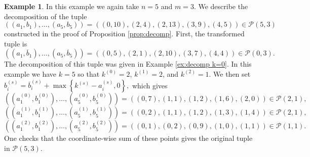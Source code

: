 \documentclass[12pt]{amsart}
\numberwithin{equation}{section}
\theoremstyle{definition}
\newtheorem{example}[theorem]{Example}
\begin{document}
\begin{example}
    In this example we again take $n=5$ and $m=3$. We describe the decomposition of the tuple
    \[ ((a_1,b_1),\dots,(a_5,b_5)) = ((0,10),(2,4),(2,13),(3,9),(4,5)) \in \mathcal{P}(5,3) \]
    constructed in the proof of Proposition \ref{prop:decomp}. First, the transformed tuple is
    \[ ((a_1,\overline{b}_1),\dots,(a_5,\overline{b}_5)) = ((0,5),(2,1),(2,10),(3,7),(4,4)) \in \mathcal{P}(0,3). \]
    The decomposition of this tuple was given in Example \ref{ex:decomp k=0}. In this example we have $k=5$ so that $k^{(0)} = 2$, $k^{(1)} = 2$, and $k^{(2)} = 1$. We then set $b^{(s)}_i = \overline{b}^{(s)}_i +\max\left\{k^{(s)} - a^{(s)}_i,0\right\},$ which gives
    \[ \left(\left(a^{(0)}_1,b^{(0)}_1\right),\dots,\left(a^{(0)}_5,b^{(0)}_5\right)\right) = ((0,7),(1,1),(1,2),(1,6),(2,0)) \in \mathcal{P}(2,1), \]
    \[ \left(\left(a^{(1)}_1,b^{(1)}_1\right),\dots,\left(a^{(1)}_5,b^{(1)}_5\right)\right) = ((0,2),(1,1),(1,2),(1,3),(1,4))\in \mathcal{P}(2,1), \]
    \[ \left(\left(a^{(2)}_1,b^{(2)}_1\right),\dots,\left(a^{(2)}_5,b^{(2)}_5\right)\right) = ((0,1),(0,2),(0,9),(1,0),(1,1))\in \mathcal{P}(1,1). \]
    One checks that the coordinate-wise sum of these points gives the original tuple in $\mathcal{P}(5,3)$.


\end{example}
\end{document}
